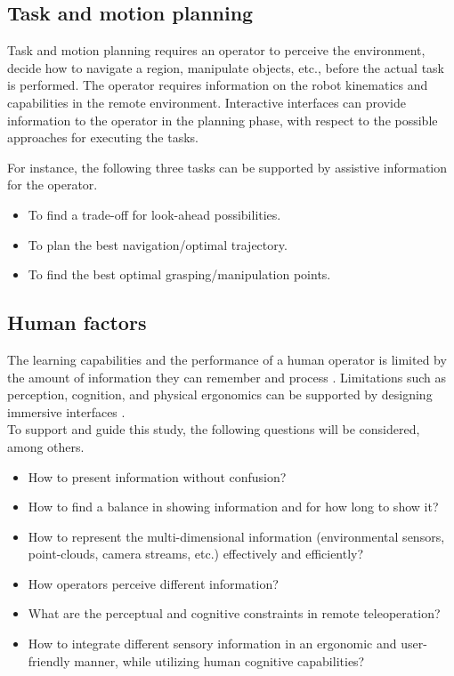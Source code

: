 
\subsection*{Task and motion planning}
Task and motion planning requires an operator to perceive the environment, decide how to navigate a region, manipulate objects, etc., before the actual task is performed. The operator requires information on the robot kinematics and capabilities in the remote environment. Interactive interfaces can provide information to the operator in the planning phase, with respect to the possible approaches for executing the tasks.

For instance, the following three tasks can be supported by assistive information for the operator.
\begin{itemize}
    \item To find a trade-off for look-ahead possibilities.
    \item To plan the best navigation/optimal trajectory.
    \item To find the best optimal grasping/manipulation points.
\end{itemize}

\subsection*{Human factors} 
The learning capabilities and the performance of a human operator is limited by the amount of information they can remember and process \cite{NAP25118}. Limitations such as perception, cognition, and physical ergonomics can be supported by designing immersive interfaces \cite{Bowman:2004:UIT:993837}.\\
To support and guide this study, the following questions will be considered, among others.
\begin{itemize}
    \item How to present information without confusion?
    \item How to find a balance in showing information and for how long to show it?
    \item How to represent the multi-dimensional information (environmental sensors, point-clouds, camera streams, etc.) effectively and efficiently?
    \item How operators perceive different information?
    \item What are the perceptual and cognitive constraints in remote teleoperation?
    \item How to integrate different sensory information in an ergonomic and user-friendly manner, while utilizing human cognitive capabilities?
\end{itemize} 


